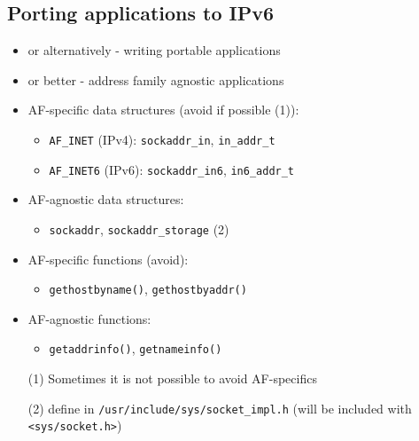 
\subsection{Porting applications to IPv6}

\begin{itemize}
  \item or alternatively - writing portable applications
  \item or better - address family agnostic applications
  \item AF-specific data structures (avoid if possible (1)):
    \begin{itemize}
      \item \texttt{AF\_INET} (IPv4): \texttt{sockaddr\_in},
         \texttt{in\_addr\_t}
      \item \texttt{AF\_INET6} (IPv6): \texttt{sockaddr\_in6},
         \texttt{in6\_addr\_t}
    \end{itemize}
  \item AF-agnostic data structures:
    \begin{itemize}
      \item \texttt{sockaddr}, \texttt{sockaddr\_storage} (2)
    \end{itemize}
  \item AF-specific functions (avoid):
    \begin{itemize}
      \item \texttt{gethostbyname()}, \texttt{gethostbyaddr()}
    \end{itemize}
  \item AF-agnostic functions:
    \begin{itemize}
      \item \texttt{getaddrinfo()}, \texttt{getnameinfo()}
    \end{itemize}
\end{itemize}




\begin{itemize}
  \item[(1)] Sometimes it is not possible to avoid AF-specifics
  \item[(2)] de{}fine in \texttt{/usr/include/sys/socket\_impl.h} (will be
  included with \texttt{<sys/socket.h>})
\end{itemize}

